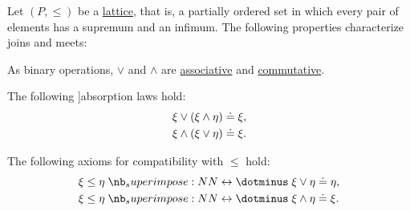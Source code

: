 \begin{proposition}\label{thm:lattice_operation_characterization}
  Let \( (P, \leq) \) be a \hyperref[def:lattice]{lattice}, that is, a partially ordered set in which every pair of elements has a supremum and an infimum. The following properties characterize joins and meets:

  \begin{thmenum}
     As binary operations, \( \vee \) and \( \wedge \) are \hyperref[def:binary_operation/associative]{associative} and \hyperref[def:binary_operation/commutative]{commutative}.

     The following \term[en=\cite[8]{Birkhoff1967}]{absorption} laws hold:
    \begin{subequations}
      \begin{align}
        \xi \vee (\xi \wedge \eta) &\doteq \xi, \label{eq:thm:lattice_operation_characterization/absorption/join} \\
        \xi \wedge (\xi \vee \eta) &\doteq \xi. \label{eq:thm:lattice_operation_characterization/absorption/meet}
      \end{align}
    \end{subequations}

     The following axioms for compatibility with \( \leq \) hold:
    \begin{subequations}
      \begin{align}
        \xi \leq \eta &\syniff \xi \vee \eta \syneq \eta, \label{eq:thm:lattice_operation_characterization/compatibility/join} \\
        \xi \leq \eta &\syniff \xi \wedge \eta \syneq \xi. \label{eq:thm:lattice_operation_characterization/compatibility/meet}
      \end{align}
    \end{subequations}
  \end{thmenum}
\end{proposition}
